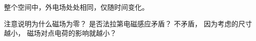 
\begin{issues}
\issueDraft
\end{issues}

整个空间中，外电场处处相同，仅随时间变化。

注意说明为什么磁场为零？ 是否法拉第电磁感应矛盾？ 不矛盾， 因为考虑的尺寸越小， 磁场对点电荷的影响就越小？
